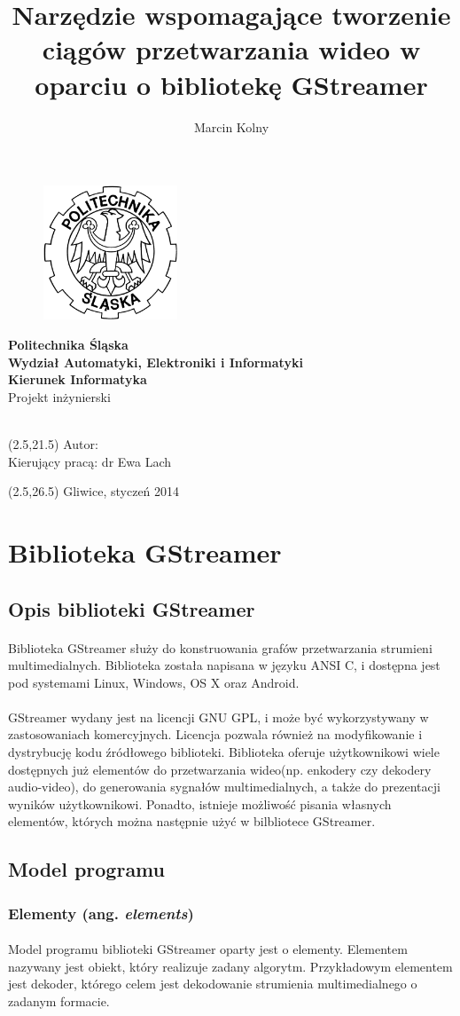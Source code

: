\documentclass{article}
\title{Narzędzie wspomagające tworzenie ciągów przetwarzania wideo w oparciu o bibliotekę GStreamer}
\author{Marcin Kolny}
\renewcommand{\maketitle}{
  \begin{titlepage}
    \begin{figure}  
      \includegraphics[width=40mm]{img/polsl-logo.png}
    \end{figure}
    \begin{center}
      \begingroup
      \fontsize{18pt}{21pt}\selectfont
      \textbf{Politechnika Śląska\\
        Wydział Automatyki, Elektroniki i Informatyki\\
        Kierunek Informatyka}\\
      \vspace{22mm}
      Projekt inżynierski\\
      \vspace{22mm}
      \endgroup
      \begingroup
      \fontsize{14pt}{17pt}\selectfont
      \thetitle \\
      \endgroup
      \vspace{30mm}
    \end{center}
    \begin{textblock}{14}(2.5,21.5)
      \fontsize{14pt}{17pt}\selectfont
      Autor: \theauthor \\
      Kierujący pracą: dr Ewa Lach\\
    \end{textblock}
    \begin{textblock}{20}(2.5,26.5)
      \fontsize{14pt}{17pt}\selectfont
      Gliwice, styczeń 2014\\
    \end{textblock}

  \end{titlepage}
}
\begin{document}
\maketitle
\tableofcontents
\cleardoublepage
\section{Biblioteka GStreamer}
\subsection{Opis biblioteki GStreamer}
\paragraph{}
Biblioteka GStreamer służy do konstruowania grafów przetwarzania strumieni multimedialnych. Biblioteka została napisana w języku ANSI C, i dostępna jest pod systemami Linux, Windows, OS X oraz Android.
\paragraph{}
GStreamer wydany jest na licencji GNU GPL, i może być wykorzystywany w zastosowaniach komercyjnych. Licencja pozwala również na modyfikowanie i dystrybucję kodu źródłowego biblioteki.
Biblioteka oferuje użytkownikowi wiele dostępnych już elementów do przetwarzania wideo(np. enkodery czy dekodery audio-video), do generowania sygnałów multimedialnych, a także do prezentacji wyników użytkownikowi. Ponadto, istnieje możliwość pisania własnych elementów, których można następnie użyć w bilbliotece GStreamer.
\subsection{Model programu}
\subsubsection{Elementy (ang. \textit{elements})}
\paragraph{}
Model programu biblioteki GStreamer oparty jest o elementy. Elementem nazywany jest obiekt, który realizuje zadany algorytm. Przykładowym elementem jest dekoder, którego celem jest dekodowanie strumienia multimedialnego o zadanym formacie.
\end{document}
